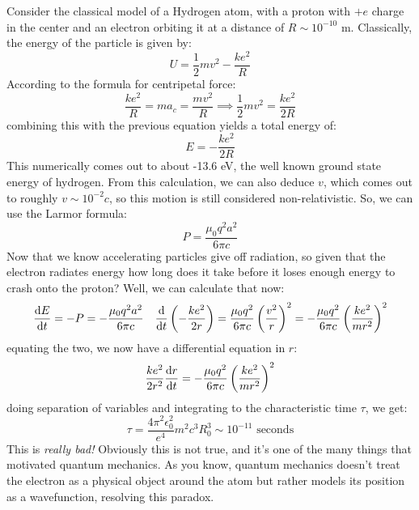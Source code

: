 \begin{example}
	Consider the classical model of a Hydrogen atom, with a proton with \( +e \) charge in the center and an
	electron orbiting it at a distance of \( R \sim 10^{-10} \) m. Classically, the energy of the particle is
	given by:
	\[
		U = \frac{1}{2}mv^2 - \frac{ke^2}{R}
	\]
	According to the formula for centripetal force:
	\[
		\frac{ke^2}{R} = m a_c = \frac{mv^2}{R} \implies \frac{1}{2} mv^2 = \frac{ke^2}{2R}
	\]
	combining this with the previous equation yields a total energy of:
	\[
		E = - \frac{ke^2}{2R}
	\]
	This numerically comes out to about -13.6 eV, the well known ground state energy of hydrogen. From this
	calculation, we can also deduce \( v \), which comes out to roughly \( v \sim 10^{-2}c \), so this motion
	is still considered non-relativistic. So, we can use the Larmor formula:
	\[
		P = \frac{\mu_0 q^2 a^2}{6 \pi c}
	\]
	Now that we know accelerating particles give off radiation, so given that the electron radiates energy
	how long does it take before it loses enough energy to crash onto the proton? Well, we can calculate that
	now:
	\[
		\dv{E}{t} = -P = -\frac{\mu_0 q^2 a^2}{6 \pi c} \quad \dv{t} \left( - \frac{ke^2}{2r} \right) =
		\frac{\mu_0 q^2}{6 \pi c} \left( \frac{v^2}{r} \right)^2 = - \frac{\mu_0 q^2}{6 \pi c}\left(
		\frac{ke^2}{mr^2} \right)^2
	\]
	equating the two, we now have a differential equation in \( r \):
	\[
		\frac{ke^2}{2r^2} \dv{r}{t} = - \frac{\mu_0 q^2}{6 \pi c} \left( \frac{ke^2}{mr^2} \right)^2
	\]
	doing separation of variables and integrating to the characteristic time \( \tau \), we get:
	\[
		\tau = \frac{4\pi^2 \epsilon_0^2}{e^{4}} m^2 c^3 R_0^3 \sim 10^{-11} \text{ seconds}
	\]
	This is \textit{really bad!} Obviously this is not true, and it's one of the many things that motivated
	quantum mechanics. As you know, quantum mechanics doesn't treat the electron as a physical object around
	the atom but rather models its position as a wavefunction, resolving this paradox.   
\end{example}







